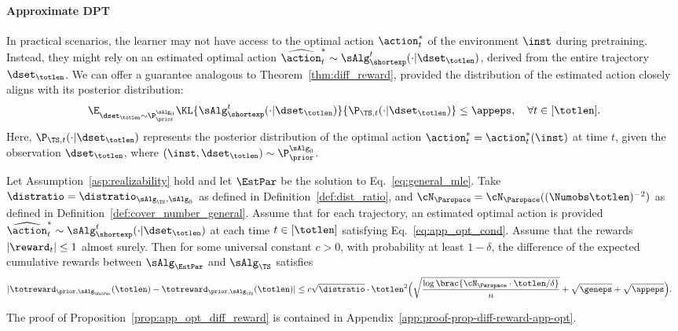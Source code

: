 \documentclass[10pt]{article}
\begin{document}
\paragraph{Approximate DPT} In practical scenarios, the learner may not have access to the optimal action $\action^*_t$ of the environment $\inst$ during pretraining. Instead, they might rely on an estimated optimal action $\widehat\action_t^* \sim \sAlg_{\shortexp}^t(\cdot | \dset_\totlen)$, derived from the entire trajectory $\dset_\totlen$. We can offer a guarantee analogous to Theorem~\ref{thm:diff_reward}, provided the distribution of the estimated action closely aligns with its posterior distribution:
\begin{align}\E_{\dset_\totlen\sim\P_{\prior}^{\sAlg_0}}\KL{\sAlg_{\shortexp}^t(\cdot | \dset_\totlen)}{\P_{\TS,t}(\cdot|\dset_\totlen)}\leq\appeps,~~~ \forall t \in [\totlen].
\label{eq:app_opt_cond}
\end{align}
Here, $\P_{\TS,t}(\cdot|\dset_\totlen)$ represents the posterior distribution of the optimal action $\action^*_t=\action^*_t(\inst)$ at time $t$, given the observation $\dset_\totlen$, where $(\inst, \dset_\totlen) \sim \P_\prior^{\sAlg_0}$.


\begin{proposition}\label{prop:app_opt_diff_reward} Let Assumption~\ref{asp:realizability} hold and let $\EstPar$ be the solution to Eq.~\eqref{eq:general_mle}. Take $\distratio = \distratio_{\sAlg_\TS,\sAlg_0}$ as defined in Definition~\ref{def:dist_ratio}, and $\cN_{\Parspace} = \cN_{\Parspace}((\Numobs\totlen)^{-2})$  as defined in Definition~\ref{def:cover_number_general}. Assume that for each trajectory, an estimated optimal action is provided $\widehat\action_t^* \sim \sAlg_{\shortexp}^t(\cdot | \dset_\totlen)$ at each time $t\in[\totlen]$ satisfying Eq.~\eqref{eq:app_opt_cond}.
Assume that the rewards $|\reward_t|\leq 1$  almost surely. Then for some universal constant $c>0$, with probability at least $1-\delta$, the difference of the expected cumulative rewards between $\sAlg_\EstPar$ and $\sAlg_\TS$ satisfies
\begin{align*}
|\totreward_{\prior,\sAlg_\EstPar}(\totlen)-\totreward_{\prior,\sAlg_\TS}(\totlen)|
&\leq
c \sqrt{\distratio}\cdot\totlen^2 \Big( \sqrt{\frac{\log \brac{ \cN_{\Parspace} \cdot \totlen/\delta } }{n} } + \sqrt{\geneps} + \sqrt{\appeps} \Big).
\end{align*}
\end{proposition}
The proof of Proposition~\ref{prop:app_opt_diff_reward} is contained in Appendix~\ref{app:proof-prop-diff-reward-app-opt}.
\end{document}

